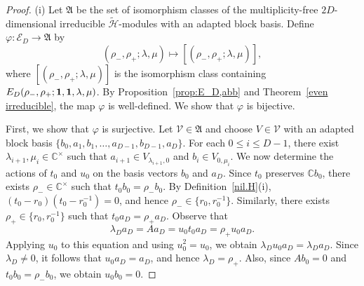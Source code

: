\documentclass[reqno]{amsart}
\theoremstyle{definition}
\begin{document}
\begin{proof}
%
(i)
Let $\mathfrak{A}$ be the set of isomorphism classes of the
multiplicity-free $2D$-dimensional irreducible
$\widetilde{\mathcal{H}}$-modules with an adapted block basis.
Define $\varphi:\mathcal{E}_D \to \mathfrak{A}$ by
$$
(\rho_-,\rho_+;\lambda,\mu)
\mapsto
[(\rho_-,\rho_+;\lambda,\mu)],
$$
where $[(\rho_-,\rho_+;\lambda,\mu)]$ is the isomorphism class containing
$E_D(\rho_-,\rho_+;{\bf 1},{\bf 1},\lambda,\mu)$.
By Proposition~\ref{prop:E_D,abb} and
Theorem~\ref{even irreducible}, the map $\varphi$ is well-defined.
We show that $\varphi$ is bijective.

First, we show that $\varphi$ is surjective.
Let $\mathcal{V}\in\mathfrak{A}$ and choose
$V\in\mathcal{V}$ with an adapted block basis
$\{b_0,a_1,b_1,\dots,a_{D-1},b_{D-1},a_D\}$.
For each $0\leq i\leq D-1$, there exist
$\lambda_{i+1},\mu_i\in\mathbb{C}^{\times}$ such that
$a_{i+1}\in V_{\lambda_{i+1},0}$ and $b_i\in V_{0,\mu_i}$.
We now determine the actions of $t_0$ and $u_0$ on the basis vectors $b_0$ and $a_D$.
Since $t_0$ preserves $\mathbb{C}b_0$, there exists
$\rho_-\in\mathbb{C}^{\times}$ such that
$t_0b_0=\rho_-b_0$.
By Definition~\ref{nil.H}(i), $(t_0-r_0)(t_0-r_0^{-1})=0$, and hence
$\rho_-\in\{r_0,r_0^{-1}\}$.
Similarly, there exists $\rho_+\in\{r_0,r_0^{-1}\}$ such that
$t_0a_D=\rho_+a_D$.
Observe that
$$
\lambda_Da_D=Aa_D=u_0t_0a_D=\rho_+u_0a_D.
$$
Applying $u_0$ to this equation and using $u_0^2=u_0$, we obtain
$\lambda_Du_0a_D=\lambda_Da_D$.
Since $\lambda_D\neq0$, it follows that $u_0a_D=a_D$, and hence
$\lambda_D=\rho_+$.
Also, since $Ab_0=0$ and $t_0b_0=\rho_-b_0$, we obtain
$u_0b_0=0$.


\end{proof}
\end{document}
